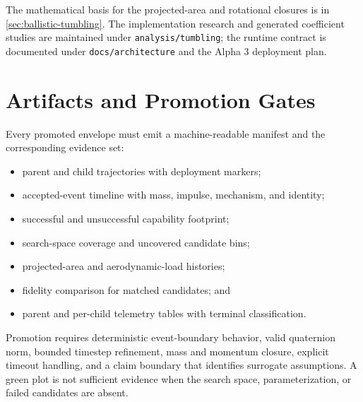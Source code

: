 The mathematical basis for the projected-area and rotational closures is in
\cref{sec:ballistic-tumbling}. The implementation research and generated
coefficient studies are maintained under \texttt{analysis/tumbling}; the
runtime contract is documented under \texttt{docs/architecture} and the Alpha
3 deployment plan.

\section{Artifacts and Promotion Gates}\label{sec:compiled-artifacts}

Every promoted envelope must emit a machine-readable manifest and the
corresponding evidence set:

\begin{itemize}
  \item parent and child trajectories with deployment markers;
  \item accepted-event timeline with mass, impulse, mechanism, and identity;
  \item successful and unsuccessful capability footprint;
  \item search-space coverage and uncovered candidate bins;
  \item projected-area and aerodynamic-load histories;
  \item fidelity comparison for matched candidates; and
  \item parent and per-child telemetry tables with terminal classification.
\end{itemize}

Promotion requires deterministic event-boundary behavior, valid quaternion
norm, bounded timestep refinement, mass and momentum closure, explicit timeout
handling, and a claim boundary that identifies surrogate assumptions. A green
plot is not sufficient evidence when the search space, parameterization, or
failed candidates are absent.
